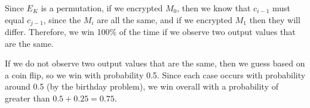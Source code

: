 \begin{enumerate}[label=(\alph*)]
    Since $E_K$ is a permutation, if we encrypted $M_0$, then we know that $c_{i-1}$ must equal $c_{j-1}$, since the $M_i$ are all the same, and if we encrypted $M_1$ then they will differ. Therefore, we win 100\% of the time if we observe two output values that are the same.

    If we do not observe two output values that are the same, then we guess based on a coin flip, so we win with probability 0.5. Since each case occurs with probability around 0.5 (by the birthday problem), we win overall with a probability of greater than $0.5 + 0.25 = 0.75$.
    
        
\end{enumerate}

